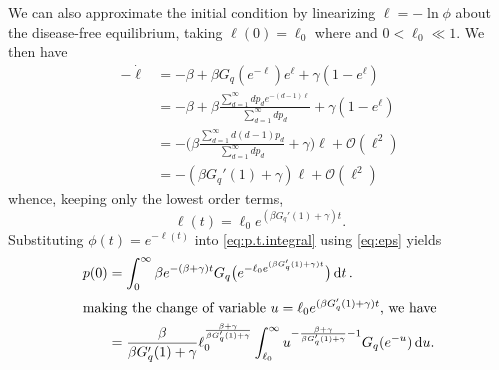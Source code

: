 \documentclass[11pt]{article}
\newcommand{\dee}{{\rm d}}
\newcommand{\Oh}{\mathcal{O}}
\begin{document}
We can also approximate the initial condition by linearizing $\ell = -\ln \phi$ about the disease-free equilibrium, taking $\ell(0) = \ell_{0}$ where and $0 < \ell_{0} \ll 1$.  We then have \begin{subequations}
\begin{align}
	-\dot{\ell} &= -\beta + \beta G_{q}(e^{-\ell})e^{\ell} + \gamma (1-e^{\ell})\\
	&= - \beta + \beta \frac{\sum_{d=1}^{\infty} d p_{d} e^{-(d-1)\ell}}{\sum_{d=1}^{\infty} d p_{d}} + \gamma (1-e^{\ell})\\
	&= -\bigg(\beta \frac{\sum_{d=1}^{\infty} d(d-1) p_{d}}{\sum_{d=1}^{\infty} d p_{d}} + \gamma\bigg) \ell + \Oh(\ell^{2})\\
	&= -(\beta G_{q}'(1)+\gamma)\ell + \Oh(\ell^{2})
\end{align}
\end{subequations}
whence, keeping only the lowest order terms, 
\begin{equation}\label{eq:eps}
	\ell(t) = \ell_{0} e^{(\beta G_{q}'(1)+\gamma)t}.
\end{equation}
Substituting $\phi(t) = e^{-\ell(t)}$ into \eqref{eq:p.t.integral} using \eqref{eq:eps} yields
\begin{subequations}\label{eq:p0.int}
\begin{align}
	p(0) &= \int_{0}^{\infty} \beta e^{-(\beta+\gamma)t} G_{q}\big(e^{-\ell_{0} e^{(\beta G_{q}'(1)+\gamma)t}}\big)\, \dee t\, .\\
\intertext{making the change of variable $u =\ell_{0} e^{(\beta G_{q}'(1)+\gamma)t}$, we have}
	&=\frac{\beta}{\beta G_{q}'(1)+\gamma} \ell_{0}^{\frac{\beta+\gamma}{\beta G_{q}'(1)+\gamma}}
		\int_{\ell_{0}}^{\infty} u^{-\frac{\beta+\gamma}{\beta G_{q}'(1)+\gamma}-1} G_{q}(e^{-u})\, \dee u.\label{eq:p0.int.u}
\end{align}
\end{subequations}
\end{document}
